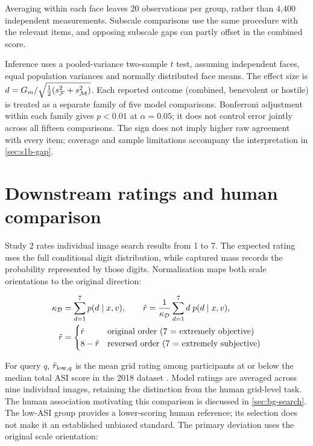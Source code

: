 Averaging within each face leaves 20 observations per group, rather than
4,400 independent measurements. Subscale comparisons use the same procedure
with the relevant items, and opposing subscale gaps can partly offset in
the combined score.

Inference uses a pooled-variance two-sample $t$ test, assuming independent
faces, equal population variances and normally distributed face means.
The effect size is $d=G_m/\sqrt{\tfrac12(s^2_{\mathcal{F}}+s^2_{\mathcal{M}})}$.
Each reported outcome (combined, benevolent or hostile) is treated as a
separate family of five model comparisons. Bonferroni adjustment within each
family gives $p<0.01$ at $\alpha=0.05$; it does not control error jointly
across all fifteen comparisons.
The sign does not imply higher raw agreement with every item; coverage
and sample limitations accompany the interpretation in \cref{sec:s1b-gap}.

\section{Downstream ratings and human comparison}\label{sec:framework-ratings}\label{sec:framework-extrinsic}

Study 2 rates individual image search results from 1 to 7.
The expected rating uses the full conditional digit distribution, while
captured mass records the probability represented by those digits.
Normalisation maps both scale orientations to the original direction:

\begin{align}
  \kappa_{\mathcal{D}} &= \sum_{d=1}^{7} p(d\mid x,v), \qquad
  \hat r = \frac{1}{\kappa_{\mathcal{D}}}\sum_{d=1}^{7} d\; p(d\mid x,v), \label{eq:rexp}\\
  \tilde r &= \begin{cases} \hat r & \text{original order (7 = extremely objective)}\\
                          8-\hat r & \text{reversed order (7 = extremely subjective)}\end{cases}
  \label{eq:rnorm}
\end{align}

For query $q$, $\bar r_{\text{low},q}$ is the mean grid rating among participants at or
below the median total ASI score in the 2018 dataset
\cite{otterbacher2018sigir}. Model ratings are averaged across nine individual
images, retaining the distinction from the human grid-level task.
The human association motivating this comparison is discussed in
\cref{sec:bg-search}. The low-ASI group provides a lower-scoring human
reference; its selection does not make it an established unbiased standard.
The primary deviation uses the original scale orientation:

